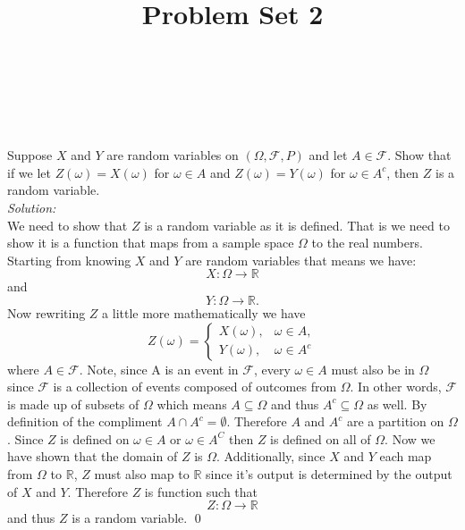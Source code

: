 \documentclass[10pt]{amsart}
\begin{document}
\noindent
{} \\
 \\
 \\
\title{Problem Set 2}
\maketitle

 Suppose $X$ and $Y$ are random variables on $(\Omega, \mathcal{F},P)$ and let $A\in \mathcal{F}$. Show that if we let $Z(\omega)=X(\omega)$ for $\omega \in A$ and $Z(\omega)=Y(\omega)$ for $\omega \in A^c$, then $Z$ is a random variable. \\
\textit{Solution:} \\
We need to show that $Z$ is a random variable as it is defined.
That is we need to show it is a function that maps from a sample space $\Omega$ to the real numbers.
Starting from knowing $X$ and $Y$ are random variables that means we have:
$$ X: \Omega \rightarrow \mathbb{R} $$ and $$ Y: \Omega \rightarrow \mathbb{R}.$$
Now rewriting $Z$ a little more mathematically we have 
$$
Z(\omega)= \begin{cases}
 	X(\omega), & \omega \in A, \\
	Y(\omega), & \omega \in A^c
\end{cases}
$$
where \( A \in \mathcal{F}\).
Note, since A is an event in \(\mathcal{F}\), every $\omega \in A$ must also be in $\Omega$ since \(\mathcal{F}\) is a collection of events composed of outcomes from \(\Omega\).
In other words, \(\mathcal{F}\) is made up of subsets of \(\Omega\) which means $A \subseteq \Omega$ and thus \(A^c \subseteq \Omega\) as well.
By definition of the compliment $A \cap  A^c = \emptyset $.
Therefore $A$ and $A^c$ are a partition on $\Omega$.
Since $Z$ is defined on  $\omega \in A$ or $\omega \in A^C$ then $Z$ is defined on all of $\Omega$.
Now we have shown that the domain of $Z$ is $\Omega$.
Additionally, since $X$ and $Y$ each map from $\Omega$ to $\mathbb{R}$, $Z$ must also map to $\mathbb{R}$ since it's output is determined by the output of $X$ and $Y$.
Therefore $Z$ is function such that $$Z: \Omega \rightarrow \mathbb{R}$$
and thus $Z$ is a random variable.
\qed
\\
\end{document}
